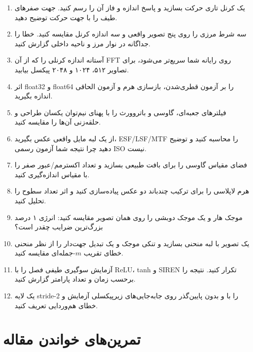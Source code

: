 \begin{enumerate}
\item یک کرنل تاری حرکت بسازید و پاسخ اندازه و فاز آن را رسم کنید. جهت صفرهای طیف را با جهت حرکت توضیح دهید.
\item سه شرط مرزی را روی پنج تصویر واقعی و سه اندازه کرنل مقایسه کنید. خطا را جداگانه در نوار مرز و ناحیه
داخلی گزارش کنید.
\item آستانه اندازه کرنلی را که از آن FFT روی رایانه شما سریع‌تر می‌شود، برای تصاویر ۵۱۲، ۱۰۲۴ و ۲۰۴۸
پیکسل بیابید.
\item اثر float32 و float64 را بر آزمون قطری‌شدن، بازسازی هرم و آزمون الحاقی اندازه بگیرید.
\item فیلترهای جعبه‌ای، گاوسی و باتروورث را با پهنای نیم‌توان یکسان طراحی و حلقه‌زنی آن‌ها را مقایسه کنید.
\item از یک لبه مایل واقعی عکس بگیرید، ESF/LSF/MTF را محاسبه کنید و توضیح دهید چرا نتیجه شما آزمون رسمی
ISO نیست.
\item فضای مقیاس گاوسی را برای بافت طبیعی بسازید و تعداد اکسترمم/عبور صفر را با مقیاس اندازه‌گیری کنید.
\item هرم لاپلاسی را برای ترکیب چندباند دو عکس پیاده‌سازی کنید و اثر تعداد سطوح را تحلیل کنید.
\item موجک هار و یک موجک دوبشی را روی همان تصویر مقایسه کنید: انرژی ۱ درصد بزرگ‌ترین ضرایب چقدر است؟
\item یک تصویر با لبه منحنی بسازید و تنکی موجک و یک تبدیل جهت‌دار را از نظر منحنی خطای تقریب \(m\)-جمله‌ای
مقایسه کنید.
\item آزمایش سوگیری طیفی فصل را با ReLU، tanh و SIREN تکرار کنید. نتیجه را برحسب زمان و تعداد پارامتر گزارش کنید.
\item یک لایه stride-2 را با و بدون پایین‌گذر روی جابه‌جایی‌های زیرپیکسلی آزمایش و خطای هم‌وردایی تعریف کنید.
\end{enumerate}

\section{تمرین‌های خواندن مقاله}

